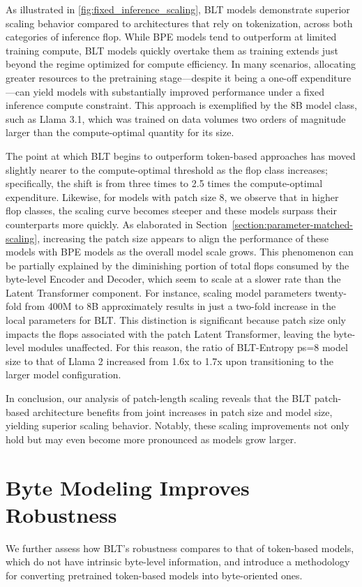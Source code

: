 As illustrated in \autoref{fig:fixed_inference_scaling}, {\textsc BLT} models demonstrate superior scaling behavior compared to architectures that rely on tokenization, across both categories of inference flop. While BPE models tend to outperform at limited training compute, {\textsc BLT} models quickly overtake them as training extends just beyond the regime optimized for compute efficiency. In many scenarios, allocating greater resources to the pretraining stage—despite it being a one-off expenditure—can yield models with substantially improved performance under a fixed inference compute constraint. This approach is exemplified by the 8B model class, such as Llama 3.1, which was trained on data volumes two orders of magnitude larger than the compute-optimal quantity for its size.

The point at which {\textsc BLT} begins to outperform token-based approaches has moved slightly nearer to the compute-optimal threshold as the flop class increases; specifically, the shift is from three times to 2.5 times the compute-optimal expenditure. Likewise, for models with patch size 8, we observe that in higher flop classes, the scaling curve becomes steeper and these models surpass their counterparts more quickly. As elaborated in Section~\ref{section:parameter-matched-scaling}, increasing the patch size appears to align the performance of these models with BPE models as the overall model scale grows. This phenomenon can be partially explained by the diminishing portion of total flops consumed by the byte-level Encoder and Decoder, which seem to scale at a slower rate than the Latent Transformer component. For instance, scaling model parameters twenty-fold from 400M to 8B approximately results in just a two-fold increase in the local parameters for {\textsc BLT}. This distinction is significant because patch size only impacts the flops associated with the patch Latent Transformer, leaving the byte-level modules unaffected. For this reason, the ratio of {\textsc BLT}-Entropy ps=8 model size to that of Llama 2 increased from 1.6x to 1.7x upon transitioning to the larger model configuration.

In conclusion, our analysis of patch-length scaling reveals that the {\textsc BLT} patch-based architecture benefits from joint increases in patch size and model size, yielding superior scaling behavior. Notably, these scaling improvements not only hold but may even become more pronounced as models grow larger.

\section{Byte Modeling Improves Robustness}
We further assess how {\textsc BLT}'s robustness compares to that of token-based models, which do not have intrinsic byte-level information, and introduce a methodology for converting pretrained token-based models into byte-oriented ones.
\label{sec:robustness}

